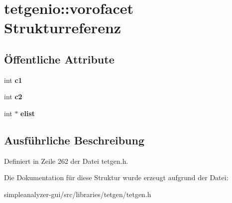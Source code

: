 \hypertarget{structtetgenio_1_1vorofacet}{\section{tetgenio\-:\-:vorofacet Strukturreferenz}
\label{structtetgenio_1_1vorofacet}
}
\subsection*{Öffentliche Attribute}
\begin{DoxyCompactItemize}
\item 
\hypertarget{structtetgenio_1_1vorofacet_a69fcc657a17f0e4565d734fbb34b3239}{int {\bfseries c1}}\label{structtetgenio_1_1vorofacet_a69fcc657a17f0e4565d734fbb34b3239}

\item 
\hypertarget{structtetgenio_1_1vorofacet_a368f7dcb47dc65f5655570e942f1e414}{int {\bfseries c2}}\label{structtetgenio_1_1vorofacet_a368f7dcb47dc65f5655570e942f1e414}

\item 
\hypertarget{structtetgenio_1_1vorofacet_a7dc623ea5f4a6006fcc20b2bc8a1f560}{int $\ast$ {\bfseries elist}}\label{structtetgenio_1_1vorofacet_a7dc623ea5f4a6006fcc20b2bc8a1f560}

\end{DoxyCompactItemize}


\subsection{Ausführliche Beschreibung}


Definiert in Zeile 262 der Datei tetgen.\-h.



Die Dokumentation für diese Struktur wurde erzeugt aufgrund der Datei\-:\begin{DoxyCompactItemize}
\item 
simpleanalyzer-\/gui/src/libraries/tetgen/tetgen.\-h\end{DoxyCompactItemize}
